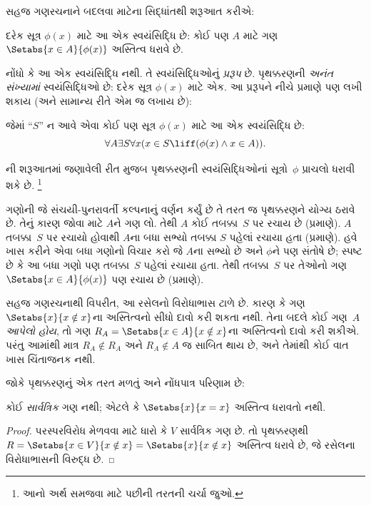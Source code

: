 \documentclass[../../../include/open-logic-section]{subfiles}
\begin{document}

સહજ ગણરચનાને બદલવા માટેના સિદ્ધાંતથી શરૂઆત કરીએ:

\begin{axiom}[પૃથક્કરણનું પ્રરૂપ]
દરેક સૂત્ર $\phi(x)$ માટે આ એક સ્વયંસિદ્ધિ છે: કોઈ પણ $A$ માટે
ગણ $\Setabs{x \in A}{\phi(x)}$ અસ્તિત્વ ધરાવે છે.
\end{axiom}

નોંધો કે આ એક સ્વયંસિદ્ધિ નથી. તે સ્વયંસિદ્ધિઓનું \emph{પ્રરૂપ}
છે. પૃથક્કરણની \emph{અનંત સંખ્યામાં} સ્વયંસિદ્ધિઓ છે: દરેક સૂત્ર
$\phi(x)$ માટે એક. આ પ્રરૂપને નીચે પ્રમાણે પણ લખી શકાય
(અને સામાન્ય રીતે એમ જ લખાય છે):

\begin{defish}
જેમાં ``$S$'' ન આવે એવા કોઈ પણ સૂત્ર $\phi(x)$ માટે આ એક
સ્વયંસિદ્ધિ છે:
\[
\forall A \exists S \forall x(x \in S \liff (\phi(x) \land x \in A)).
\]
\end{defish}

ની શરૂઆતમાં જણાવેલી રીત મુજબ પૃથક્કરણની
સ્વયંસિદ્ધિઓનાં સૂત્રો~$\phi$ પ્રાચલો ધરાવી શકે છે.
\footnote{આનો અર્થ સમજવા માટે
 પછીની તરતની
ચર્ચા જુઓ.}

ગણોની જે સંચયી-પુનરાવર્તી કલ્પનાનું વર્ણન કર્યું છે તે તરત જ
પૃથક્કરણને યોગ્ય ઠરાવે છે. તેનું કારણ જોવા માટે $A$ને ગણ લો.
તેથી $A$ કોઈ તબક્કા~$S$ પર રચાય છે (\stageshier પ્રમાણે).
$A$ તબક્કા~$S$ પર રચાયો હોવાથી $A$ના બધા સભ્યો તબક્કા $S$
પહેલાં રચાયા હતા (\stagesacc પ્રમાણે). હવે ખાસ કરીને એવા બધા
ગણોનો વિચાર કરો જે $A$ના સભ્યો છે અને $\phi$ને પણ સંતોષે છે;
સ્પષ્ટ છે કે આ બધા ગણો પણ તબક્કા~$S$ પહેલાં રચાયા હતા.
તેથી તબક્કા~$S$ પર તેઓનો ગણ $\Setabs{x \in A}{\phi(x)}$
પણ રચાય છે (\stagesacc પ્રમાણે).

સહજ ગણરચનાથી વિપરીત, આ રસેલનો વિરોધાભાસ ટાળે છે. કારણ કે
ગણ $\Setabs{x}{x \notin
x}$ના અસ્તિત્વનો સીધો દાવો કરી શકતા નથી. તેના બદલે કોઈ
ગણ~$A$ \emph{આપેલો હોય}, તો ગણ
$R_A = \Setabs{x \in A}{x \notin x}$ના અસ્તિત્વનો દાવો કરી
શકીએ. પરંતુ આમાંથી માત્ર $R_A \notin R_A$ અને $R_A \notin A$
જ સાબિત થાય છે, અને તેમાંથી કોઈ વાત ખાસ ચિંતાજનક નથી.

જોકે પૃથક્કરણનું એક તરત મળતું અને નોંધપાત્ર પરિણામ છે:

\begin{thm}
કોઈ \emph{સાર્વત્રિક} ગણ નથી; એટલે કે $\Setabs{x}{x = x}$
અસ્તિત્વ ધરાવતો નથી.
\end{thm}

\begin{proof}
પરસ્પરવિરોધ મેળવવા માટે ધારો કે $V$ સાર્વત્રિક ગણ છે. તો
પૃથક્કરણથી $R =
\Setabs{x \in V}{x \notin x} = \Setabs{x}{x \notin x}$ અસ્તિત્વ
ધરાવે છે, જે રસેલના વિરોધાભાસની વિરુદ્ધ છે.
\end{proof}
\end{document}
